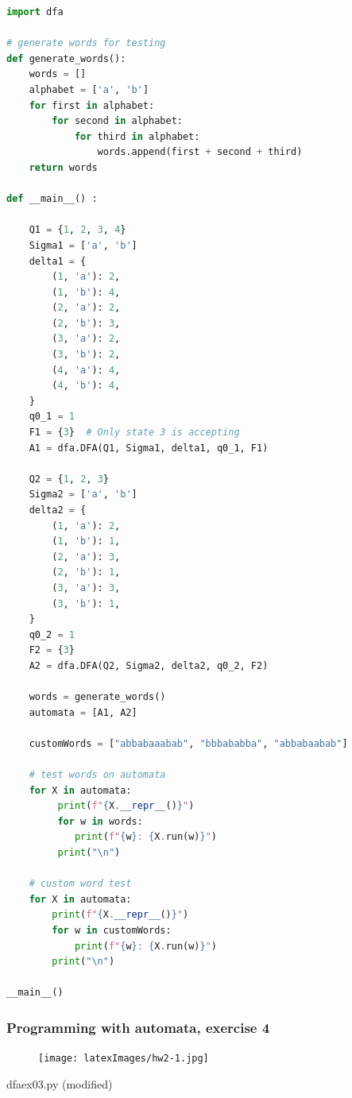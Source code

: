 \documentclass{article}
\theoremstyle{theorem}
\theoremstyle{definition}
\theoremstyle{remark}
\begin{document}
\begin{lstlisting}[language=Python]
import dfa

# generate words for testing
def generate_words():
    words = []
    alphabet = ['a', 'b']
    for first in alphabet:
        for second in alphabet:
            for third in alphabet:
                words.append(first + second + third)
    return words

def __main__() :
    
    Q1 = {1, 2, 3, 4}
    Sigma1 = ['a', 'b']
    delta1 = {
        (1, 'a'): 2,
        (1, 'b'): 4,
        (2, 'a'): 2,
        (2, 'b'): 3,
        (3, 'a'): 2,
        (3, 'b'): 2,
        (4, 'a'): 4,
        (4, 'b'): 4,
    }
    q0_1 = 1
    F1 = {3}  # Only state 3 is accepting
    A1 = dfa.DFA(Q1, Sigma1, delta1, q0_1, F1)

    Q2 = {1, 2, 3}
    Sigma2 = ['a', 'b']
    delta2 = {
        (1, 'a'): 2,
        (1, 'b'): 1,
        (2, 'a'): 3,
        (2, 'b'): 1,
        (3, 'a'): 3,
        (3, 'b'): 1,
    }
    q0_2 = 1
    F2 = {3}  
    A2 = dfa.DFA(Q2, Sigma2, delta2, q0_2, F2)
    
    words = generate_words()
    automata = [A1, A2]

    customWords = ["abbabaaabab", "bbbababba", "abbabaabab"]
    
    # test words on automata
    for X in automata:
         print(f"{X.__repr__()}")
         for w in words:
            print(f"{w}: {X.run(w)}")
         print("\n")

    # custom word test
    for X in automata:
        print(f"{X.__repr__()}")
        for w in customWords:
            print(f"{w}: {X.run(w)}")
        print("\n")

__main__()
\end{lstlisting}

\subsubsection{Programming with automata, exercise 4}
\begin{figure}[H]
    \centering
    \texttt{[image: latexImages/hw2-1.jpg]} 
\end{figure}

dfaex03.py (modified)
\end{document}
